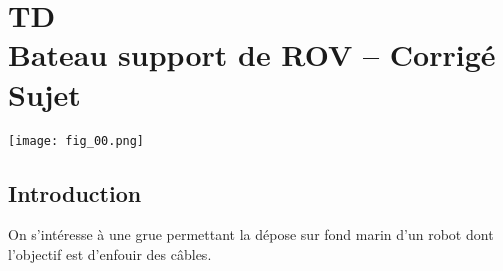 \chapter*{TD  \\ 
Bateau support de ROV -- \ifprof Corrigé \else Sujet \fi}
\iflivret {} \else
\ifprof  {} \else \fi
\fi
\setcounter{question}{0}

\begin{marginfigure}
\centering
\texttt{[image: fig\_00.png]}
\end{marginfigure}


\section*{Introduction}
\ifprof
\else
On s'intéresse à une grue permettant la dépose sur fond marin d'un robot dont l'objectif est d'enfouir des câbles.
\fi
%
%
%
%
%
%
